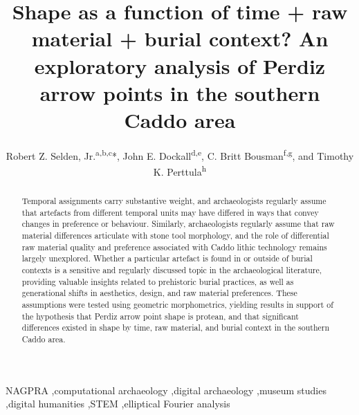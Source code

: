 \documentclass[review]{elsarticle}
\begin{document}
\begin{frontmatter}

\title{Shape as a function of time + raw material + burial context? An exploratory analysis of Perdiz arrow points in the southern Caddo area}

\author{Robert Z. Selden, Jr.\textsuperscript{a,b,c}*, John E. Dockall\textsuperscript{d,e}, C. Britt Bousman\textsuperscript{f,g}, and Timothy K. Perttula\textsuperscript{h}}
\address[1]{Heritage Research Center, Stephen F. Austin State University, US}
\address[2]{Cultural Heritage Department, Jean Monnet University, FR}
\address[3]{ORCID ID \href{http://orcid.org/0000-0002-1789-8449}{0000-0002-1789-8449}}
\address[4]{Cox|McClain Environmental Consulting, Inc., US}
\address[5]{ORCID ID \href{http://orcid.org/0000-0002-0940-7144}{0000-0002-0940-7144}}
\address[6]{Department of Anthropology, Texas State University, US}
\address[7]{ORCID ID \href{http://orcid.org/0000-0002-1645-8302}{0000-0002-1645-8302}}
\address[8]{Archeological \& Environmental Consultants, LLC, US}

\begin{abstract}
Temporal assignments carry substantive weight, and archaeologists regularly assume that artefacts from different temporal units may have differed in ways that convey changes in preference or behaviour. Similarly, archaeologists regularly assume that raw material differences articulate with stone tool morphology, and the role of differential raw material quality and preference associated with Caddo lithic technology remains largely unexplored. Whether a particular artefact is found in or outside of burial contexts is a sensitive and regularly discussed topic in the archaeological literature, providing valuable insights related to prehistoric burial practices, as well as generational shifts in aesthetics, design, and raw material preferences. These assumptions were tested using geometric morphometrics, yielding results in support of the hypothesis that Perdiz arrow point shape is protean, and that significant differences existed in shape by time, raw material, and burial context in the southern Caddo area.
\end{abstract}

\begin{keyword}
NAGPRA \sep computational archaeology \sep digital archaeology \sep museum studies \sep digital humanities \sep STEM \sep elliptical Fourier analysis
\end{keyword}

\end{frontmatter}
\end{document}
